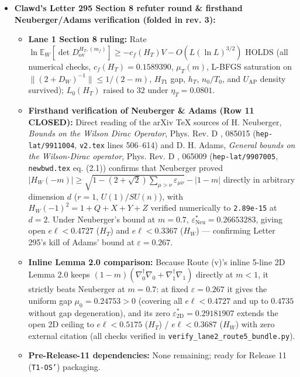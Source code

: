 \documentclass[11pt,a4paper]{article}
\begin{document}
\begin{itemize}
\item{} {\bfseries\boldmath Clawd's Letter 295 Section 8 refuter round \& firsthand Neuberger/Adams verification (folded in rev. 3):}
\begin{itemize}
\item{} {\bfseries\boldmath Lane 1 Section 8 ruling:} Rate $\ln \mathbb{E}_W[\det D_{\text{ov}}^{H_T, (m_f)}] \ge -c_f(H_T) V - O(L(\ln L)^{3/2})$ HOLDS (all numerical checks, $c_f(H_T) = 0.1589390$, $\mu_T(m)$, L-BFGS saturation on $\|(2+D_W)^{-1}\| \le 1/(2-m)$, $H_{T1}$ gap, $h_T$, $n_0/T_0$, and $U_{\text{AP}}$ density survived); $L_0(H_T)$ raised to $32$ under $\eta_T = 0.0801$.
\item{} {\bfseries\boldmath Firsthand verification of Neuberger \& Adams (Row 11 CLOSED):} Direct reading of the arXiv TeX sources of H. Neuberger, \emph{Bounds on the Wilson Dirac Operator}, Phys. Rev. D {\bfseries{}}, 085015 (\texttt{hep-lat/\allowbreak{}9911004}, \texttt{v2.tex} lines 506--614) and D. H. Adams, \emph{General bounds on the Wilson-Dirac operator}, Phys. Rev. D {\bfseries{}}, 065009 (\texttt{hep-lat/\allowbreak{}9907005}, \texttt{newbwd.tex} eq. (2.1)) confirms that Neuberger proved $|H_W(-m)| \ge \sqrt{1 - (2+\sqrt{2})\sum_{\mu>\nu}\varepsilon_{\mu\nu}} - |1 - m|$ directly in arbitrary dimension $d$ ($r = 1$, $U(1)/SU(n)$), with $H_W(-1)^2 = 1 + Q + X + Y + Z$ verified numerically to \texttt{2.89e-15} at $d = 2$. Under Neuberger's bound at $m = 0.7$, $\varepsilon_{\text{Neu}}^* = 0.26653283$, giving open $e\ell < 0.4727$ ($H_T$) and $e\ell < 0.3367$ ($H_W$) --- confirming Letter 295's kill of Adams' bound at $\varepsilon = 0.267$.
\item{} {\bfseries\boldmath Inline Lemma 2.0 comparison:} Because Route (v)'s inline 5-line 2D Lemma 2.0 keeps $(1 - m)(\nabla_0^\dagger \nabla_0 + \nabla_1^\dagger \nabla_1)$ directly at $m < 1$, it strictly beats Neuberger at $m = 0.7$: at fixed $\varepsilon = 0.267$ it gives the uniform gap $\mu_0 = 0.24753 > 0$ (covering all $e\ell < 0.4727$ and up to $0.4735$ without gap degeneration), and its zero $\varepsilon_{\text{2D}}^* = 0.29181907$ extends the open 2D ceiling to $e\ell < 0.5175$ ($H_T$) / $e\ell < 0.3687$ ($H_W$) with zero external citation (all checks verified in \texttt{verify\_lane2\_route5\_bundle.py}).
\item{} {\bfseries\boldmath Pre-Release-11 dependencies:} None remaining; ready for Release 11 (\texttt{T1-OS'}) packaging.
\end{itemize}

\end{itemize}
\end{document}
